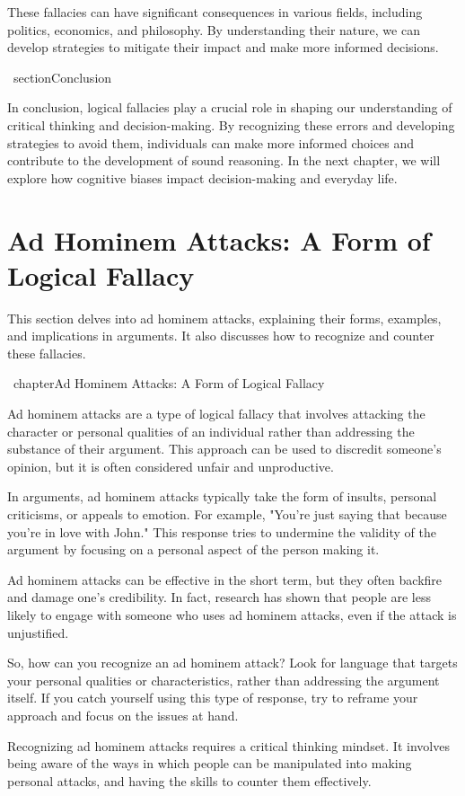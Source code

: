 \documentclass{report}%
\begin{document}
{{{{{{{{{{{{{{These fallacies can have significant consequences in various fields, including politics, economics, and philosophy. By understanding their nature, we can develop strategies to mitigate their impact and make more informed decisions.

\ section{Conclusion}

In conclusion, logical fallacies play a crucial role in shaping our understanding of critical thinking and decision-making. By recognizing these errors and developing strategies to avoid them, individuals can make more informed choices and contribute to the development of sound reasoning. In the next chapter, we will explore how cognitive biases impact decision-making and everyday life.%
\section{Ad Hominem Attacks: A Form of Logical Fallacy}%
This section delves into ad hominem attacks, explaining their forms, examples, and implications in arguments. It also discusses how to recognize and counter these fallacies.

%
\ chapter{Ad Hominem Attacks: A Form of Logical Fallacy}

 Ad hominem attacks are a type of logical fallacy that involves attacking the character or personal qualities of an individual rather than addressing the substance of their argument. This approach can be used to discredit someone's opinion, but it is often considered unfair and unproductive.

 In arguments, ad hominem attacks typically take the form of insults, personal criticisms, or appeals to emotion. For example, "You're just saying that because you're in love with John." This response tries to undermine the validity of the argument by focusing on a personal aspect of the person making it.

 Ad hominem attacks can be effective in the short term, but they often backfire and damage one's credibility. In fact, research has shown that people are less likely to engage with someone who uses ad hominem attacks, even if the attack is unjustified.

 So, how can you recognize an ad hominem attack? Look for language that targets your personal qualities or characteristics, rather than addressing the argument itself. If you catch yourself using this type of response, try to reframe your approach and focus on the issues at hand.

 Recognizing ad hominem attacks requires a critical thinking mindset. It involves being aware of the ways in which people can be manipulated into making personal attacks, and having the skills to counter them effectively.

}}}}}}}}}}}}}}
\end{document}
